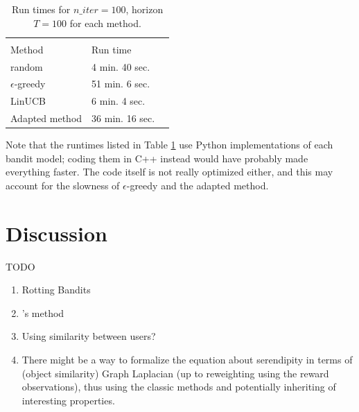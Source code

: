 \documentclass{article}
\begin{document}
\begin{table}[H]
  \caption{Run times for $n\_iter=100$, horizon $T=100$ for each method.}
  \label{runtimes}
  \centering
  \begin{tabular}{lll}
    \multicolumn{2}{c}{}                   \\
    \cmidrule(r){1-2}
    Method     & Run time    \\
    \midrule
    random & 4 min. 40 sec.  \\
    $\epsilon$-greedy & 51 min. 6 sec.  \\
    LinUCB     & 6 min. 4 sec. \\
    Adapted method     & 36 min. 16 sec.       \\
    \bottomrule
  \end{tabular}
\end{table}

Note that the runtimes listed in Table \ref{runtimes} use Python implementations of each bandit model; coding them in C++ instead would have probably made everything faster. The code itself is not really optimized either, and this may account for the slowness of $\epsilon$-greedy and the adapted method.

\section{Discussion}

TODO

\begin{enumerate}
\item Rotting Bandits
\item \cite{abbassi2009getting}'s method
\item Using similarity between users?
\item There might be a way to formalize the equation about serendipity in terms of (object similarity) Graph Laplacian (up to reweighting using the reward observations), thus using the classic methods and potentially inheriting of interesting properties.
\end{enumerate}




\end{document}
